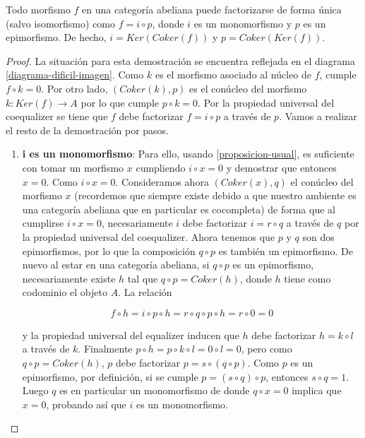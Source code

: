 \begin{teorema} \label{def:imagen}
    Todo morfismo $f$ en una categoría abeliana puede factorizarse de forma única (salvo isomorfismo) como $f = i \circ p$, donde $i$ es un monomorfismo y $p$ es un epimorfismo. De hecho, $i = Ker(Coker(f))$ y $p=Coker(Ker(f))$.
\end{teorema}
\begin{proof}
    La situación para esta demostración se encuentra reflejada en el diagrama \ref{diagrama-dificil-imagen}. Como $k$ es el morfismo asociado al núcleo de $f$, cumple $f \circ k = 0$. Por otro lado, $(Coker(k),p)$ es el conúcleo del morfismo $k: Ker(f) \longrightarrow A$ por lo que cumple $p \circ k = 0$. Por la propiedad universal del coequalizer se tiene que $f$ debe factorizar $f = i \circ p$ a través de $p$. Vamos a realizar el resto de la demostración por pasos.
    
    \begin{enumerate}
        \item \textbf{i es un monomorfismo}: Para ello, usando \ref{proposicion-usual}, es suficiente con tomar un morfismo $x$ cumpliendo $i \circ x = 0$ y demostrar que entonces $x = 0$. Como $i \circ x = 0$. Consideramos ahora $(Coker(x),q)$ el conúcleo del morfismo $x$ (recordemos que siempre existe debido a que nuestro ambiente es una categoría abeliana que en particular es cocompleta) de forma que al cumplirse $i \circ x = 0$, necesariamente $i$ debe factorizar $i = r \circ q$ a través de $q$ por la propiedad universal del coequalizer. Ahora tenemos que $p$ y $q$ son dos epimorfismos, por lo que la composición $q \circ p$ es también un epimorfismo. De nuevo al estar en una categoría abeliana, si $q \circ p$ es un epimorfismo, necesariamente existe $h$ tal que $q \circ p = Coker(h)$, donde $h$ tiene como codominio el objeto $A$. La relación
        
        \begin{equation}
            f \circ h = i \circ p \circ h = r \circ q \circ p \circ h = r \circ 0 = 0
        \end{equation}

        y la propiedad universal del equalizer inducen que $h$ debe factorizar $h = k \circ l$  a través de $k$. Finalmente $p \circ h = p \circ k \circ l = 0 \circ l = 0$, pero como $q \circ p = Coker(h)$, $p$ debe factorizar $p = s \circ (q \circ p)$. Como $p$ es un epimorfismo, por definición, si se cumple $p = (s \circ q) \circ p$, entonces $s \circ q = 1$. Luego $q$ es en particular un monomorfismo de donde $q \circ x = 0$ implica que $x = 0$, probando así que $i$ es un monomorfismo.
        

\end{enumerate}
\end{proof}
